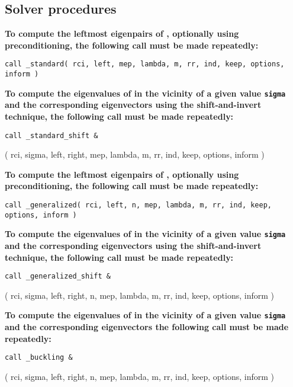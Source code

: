 \subsection{Solver procedures}

{\bf
To compute %
the leftmost eigenpairs of ,
optionally using preconditioning,
the following call must be made repeatedly:
}

\medskip
{\tt call
\solver\_standard( rci, left, mep, lambda, m, rr, ind, keep, options, inform )
}

\medskip
\noindent
{\bf
To compute the eigenvalues of  %
in the vicinity of a given value {\tt sigma}
and the corresponding eigenvectors using the shift-and-invert technique,
the following call must be made repeatedly:
}

\medskip
{\tt call
\solver\_standard\_shift \&

\hspace{8mm} 
( rci, sigma, left, right, mep, lambda, m, rr, ind, keep, options, inform )
}

\medskip
\noindent
{\bf
To compute the leftmost eigenpairs of ,
optionally using preconditioning,
the following call must be made repeatedly:
}

\medskip
{\tt call
\solver\_generalized( rci, left, n, mep, lambda, m, rr, ind, 
keep, options, inform )
}

\medskip
\noindent
{\bf
To compute the eigenvalues of  %
in the vicinity of 
a given value {\tt sigma}
and the corresponding eigenvectors using the shift-and-invert technique,
the following call must be made repeatedly:
}

\medskip
{\tt call
\solver\_generalized\_shift \&

\hspace{8mm} 
( rci, sigma, left, right, n, mep, lambda, m, rr, ind, keep, options, inform )
}

\medskip
\noindent
{\bf
To compute the eigenvalues of 
in the vicinity of a given value {\tt sigma}
and the corresponding eigenvectors 
the following call must be made repeatedly:
}

\medskip
{\tt call
\solver\_buckling \&

\hspace{8mm} 
( rci, sigma, left, right, n, mep, lambda, m, rr, ind, keep, options, inform )
}

